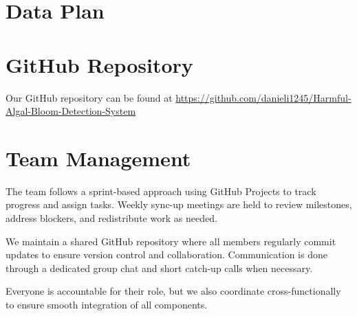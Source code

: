 \documentclass[12pt]{article}
\begin{document}
\section{Data Plan}



\section{GitHub Repository}
Our GitHub repository can be found at \href{https://github.com/danieli1245/Harmful-Algal-Bloom-Detection-System}{https://github.com/danieli1245/Harmful-Algal-Bloom-Detection-System} 



\section{Team Management}
The team follows a sprint-based approach using GitHub Projects to track progress and assign tasks. Weekly sync-up meetings are held to review milestones, address blockers, and redistribute work as needed.

We maintain a shared GitHub repository where all members regularly commit updates to ensure version control and collaboration. Communication is done through a dedicated group chat and short catch-up calls when necessary.

Everyone is accountable for their role, but we also coordinate cross-functionally to ensure smooth integration of all components.





 
\end{document}
